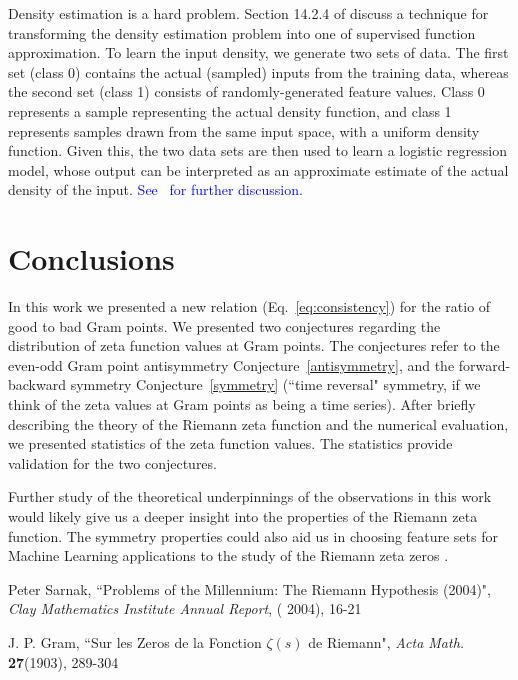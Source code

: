 \documentclass[twoside]{article}
\theoremstyle{definition}
\begin{document}
{Density estimation is a hard problem. Section 14.2.4 of \cite{Friedman(2001)}  discuss a technique for transforming the density estimation problem into one of supervised function approximation. To learn the input density, we generate two sets of data. The first set (class 0) contains the actual (sampled) inputs from the training data, whereas the second set (class 1) consists of randomly-generated feature values. Class 0 represents a sample representing the actual density function, and class 1 represents samples drawn from the same input space, with a uniform density function. Given this, the two data sets are then used to learn a logistic regression model, whose output can be interpreted as an approximate estimate of the actual density of the input. \textcolor{blue}{See~\cite{Friedman(2001)} for further discussion. }     


\section{\label{conclusions}Conclusions}

In this work we presented a new  relation (Eq.~\ref{eq:consistency}) for the ratio of good to bad Gram points. We presented two conjectures regarding the distribution of zeta function values at Gram points. The conjectures refer to the even-odd Gram point antisymmetry Conjecture~\ref{antisymmetry}, and the forward-backward symmetry Conjecture~\ref{symmetry} (``time reversal" symmetry, if we think of the zeta values at Gram points as being a time series). After briefly describing the theory of the Riemann zeta function and the numerical evaluation, we presented statistics of the zeta function values. The statistics provide validation for the two conjectures.

Further study of the theoretical underpinnings of the observations in this work would likely give us a deeper insight into the properties of the Riemann zeta function. The symmetry properties could also aid us in choosing feature sets for Machine Learning applications to the study of the Riemann zeta zeros \cite{osneural,osentropy}.

\begin{thebibliography} {}

 Peter Sarnak,
``Problems of the Millennium: The Riemann Hypothesis (2004)",  {\it Clay Mathematics Institute Annual Report}, ( 2004), 
16-21

 J. P. Gram, 
``Sur les Zeros de la Fonction  $\zeta ( s )$  de Riemann",
{\it Acta Math.} {\bf27}(1903), 289-304


\end{thebibliography}}
\end{document}
